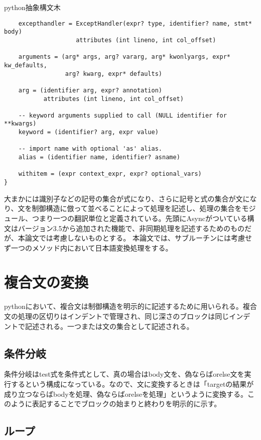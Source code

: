 \begin{itembox}[l]{python抽象構文木}
\begin{verbatim}
    excepthandler = ExceptHandler(expr? type, identifier? name, stmt* body)
                    attributes (int lineno, int col_offset)

    arguments = (arg* args, arg? vararg, arg* kwonlyargs, expr* kw_defaults,
                 arg? kwarg, expr* defaults)

    arg = (identifier arg, expr? annotation)
           attributes (int lineno, int col_offset)

    -- keyword arguments supplied to call (NULL identifier for **kwargs)
    keyword = (identifier? arg, expr value)

    -- import name with optional 'as' alias.
    alias = (identifier name, identifier? asname)

    withitem = (expr context_expr, expr? optional_vars)
}
\end{verbatim}
\end{itembox}

大まかには識別子などの記号の集合が式になり、さらに記号と式の集合が文になり、文を制御構造に倣って並べることによって処理を記述し、処理の集合をモジュール、つまり一つの翻訳単位と定義されている。先頭にAsyncがついている構文はバージョン3.5から追加された機能で、非同期処理を記述するためのものだが、本論文では考慮しないものとする。
本論文では、サブルーチンには考慮せず一つのメソッド内において日本語変換処理をする。

\section{複合文の変換}

pythonにおいて、複合文は制御構造を明示的に記述するために用いられる。複合文の処理の区切りはインデントで管理され、同じ深さのブロックは同じインデントで記述される。一つまたは文の集合として記述される。

\subsection{条件分岐}

条件分岐はtest式を条件式として、真の場合はbody文を、偽ならばorelse文を実行するという構成になっている。なので、文に変換するときは「targetの結果が成り立つならばbodyを処理、偽ならばorelseを処理」というように変換する。このように表記することでブロックの始まりと終わりを明示的に示す。

\subsection{ループ}

